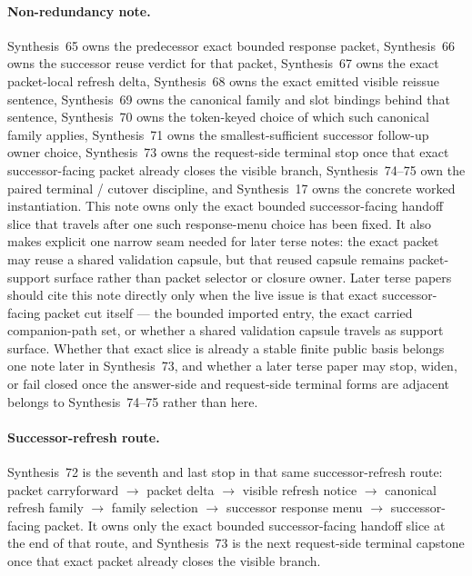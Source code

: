 \documentclass[11pt]{article}
\begin{document}
\paragraph{Non-redundancy note.}
Synthesis~65 owns the predecessor exact bounded response packet, Synthesis~66 owns the successor reuse verdict for that packet, Synthesis~67 owns the exact packet-local refresh delta, Synthesis~68 owns the exact emitted visible reissue sentence, Synthesis~69 owns the canonical family and slot bindings behind that sentence, Synthesis~70 owns the token-keyed choice of which such canonical family applies, Synthesis~71 owns the smallest-sufficient successor follow-up owner choice, Synthesis~73 owns the request-side terminal stop once that exact successor-facing packet already closes the visible branch, Synthesis~74--75 own the paired terminal / cutover discipline, and Synthesis~17 owns the concrete worked instantiation.\cite{series:publicrequestresponsepackets,series:publicrequestresponsepacketcarryforward,series:publicrequestresponsepacketdeltas,series:publicrequestresponsepacketrefreshnotices,series:publicrequestresponsepacketrefreshnoticenormalforms,series:publicrequestresponsepacketrefreshnoticeselections,series:publicrequestresponsepacketrefreshresponsemenus,series:publicrequestresponsepacketrefreshresponsepacketclosureverdicts,series:pairedterminalcitationdiscipline,series:pairedterminalcutoverrules,series:workedexample}
This note owns only the exact bounded successor-facing handoff slice that travels after one such response-menu choice has been fixed. It also makes explicit one narrow seam needed for later terse notes: the exact packet may reuse a shared validation capsule, but that reused capsule remains packet-support surface rather than packet selector or closure owner. Later terse papers should cite this note directly only when the live issue is that exact successor-facing packet cut itself --- the bounded imported entry, the exact carried companion-path set, or whether a shared validation capsule travels as support surface. Whether that exact slice is already a stable finite public basis belongs one note later in Synthesis~73, and whether a later terse paper may stop, widen, or fail closed once the answer-side and request-side terminal forms are adjacent belongs to Synthesis~74--75 rather than here.

\paragraph{Successor-refresh route.}
Synthesis~72 is the seventh and last stop in that same successor-refresh route: packet carryforward $\rightarrow$ packet delta $\rightarrow$ visible refresh notice $\rightarrow$ canonical refresh family $\rightarrow$ family selection $\rightarrow$ successor response menu $\rightarrow$ successor-facing packet.
It owns only the exact bounded successor-facing handoff slice at the end of that route, and Synthesis~73 is the next request-side terminal capstone once that exact packet already closes the visible branch.
\end{document}
